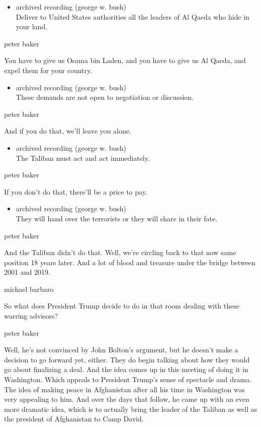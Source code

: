 \begin{itemize}
\tightlist
\item
  archived recording (george w. bush)\\
  Deliver to United States authorities all the leaders of Al Qaeda who
  hide in your land.
\end{itemize}

peter baker

You have to give us Osama bin Laden, and you have to give us Al Qaeda,
and expel them for your country.

\begin{itemize}
\tightlist
\item
  archived recording (george w. bush)\\
  These demands are not open to negotiation or discussion.
\end{itemize}

peter baker

And if you do that, we'll leave you alone.

\begin{itemize}
\tightlist
\item
  archived recording (george w. bush)\\
  The Taliban must act and act immediately.
\end{itemize}

peter baker

If you don't do that, there'll be a price to pay.

\begin{itemize}
\tightlist
\item
  archived recording (george w. bush)\\
  They will hand over the terrorists or they will share in their fate.
\end{itemize}

peter baker

And the Taliban didn't do that. Well, we're circling back to that now
same position 18 years later. And a lot of blood and treasure under the
bridge between 2001 and 2019.

michael barbaro

So what does President Trump decide to do in that room dealing with
these warring advisors?

peter baker

Well, he's not convinced by John Bolton's argument, but he doesn't make
a decision to go forward yet, either. They do begin talking about how
they would go about finalizing a deal. And the idea comes up in this
meeting of doing it in Washington. Which appeals to President Trump's
sense of spectacle and drama. The idea of making peace in Afghanistan
after all his time in Washington was very appealing to him. And over the
days that follow, he came up with an even more dramatic idea, which is
to actually bring the leader of the Taliban as well as the president of
Afghanistan to Camp David.

